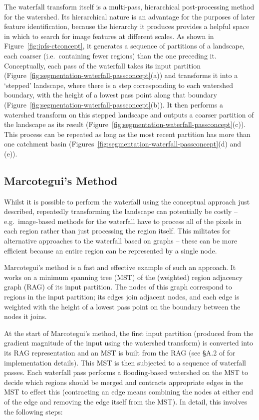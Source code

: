 \documentclass[preprint,a4paper]{elsarticle}
\begin{document}
The waterfall transform itself is a multi-pass, hierarchical post-processing method for the watershed. Its hierarchical nature is an advantage for the purposes of later feature identification, because the hierarchy it produces provides a helpful space in which to search for image features at different scales. As shown in Figure~\ref{fig:ipfs-ctconcept}, it generates a sequence of partitions of a landscape, each coarser (i.e.~containing fewer regions) than the one preceding it. Conceptually, each pass of the waterfall takes its input partition (Figure~\ref{fig:segmentation-waterfall-passconcept}(a)) and transforms it into a `stepped' landscape, where there is a step corresponding to each watershed boundary, with the height of a lowest pass point along that boundary (Figure~\ref{fig:segmentation-waterfall-passconcept}(b)). It then performs a watershed transform on this stepped landscape and outputs a coarser partition of the landscape as its result (Figure~\ref{fig:segmentation-waterfall-passconcept}(c)). This process can be repeated as long as the most recent partition has more than one catchment basin (Figures~\ref{fig:segmentation-waterfall-passconcept}(d) and (e)).

\subsection{Marcotegui's Method}

Whilst it is possible to perform the waterfall using the conceptual approach just described, repeatedly transforming the landscape can potentially be costly -- e.g.~image-based methods for the waterfall have to process all of the pixels in each region rather than just processing the region itself. This militates for alternative approaches to the waterfall based on graphs -- these can be more efficient because an entire region can be represented by a single node.

Marcotegui's method \cite{marcotegui05} is a fast and effective example of such an approach. It works on a minimum spanning tree (MST) of the (weighted) region adjacency graph (RAG) of its input partition\footnotemark{}. The nodes of this graph correspond to regions in the input partition; its edges join adjacent nodes, and each edge is weighted with the height of a lowest pass point on the boundary between the nodes it joins.


At the start of Marcotegui's method, the first input partition (produced from the gradient magnitude of the input using the watershed transform) is converted into its RAG representation and an MST is built from the RAG (see \S{}A.2 of \cite{golodetz11} for implementation details). This MST is then subjected to a sequence of waterfall passes. Each waterfall pass performs a flooding-based watershed on the MST to decide which regions should be merged and contracts appropriate edges in the MST to effect this (contracting an edge means combining the nodes at either end of the edge and removing the edge itself from the MST)\footnotemark{}. In detail, this involves the following steps:
\end{document}
